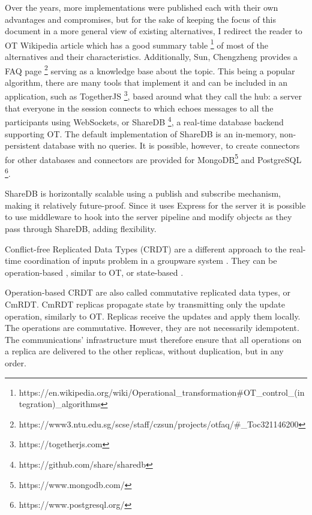 Over the years, more implementations were published each with their own advantages and compromises, but for the sake of keeping the focus of this document in a more general view of existing alternatives, I redirect the reader to OT Wikipedia article which has a good summary table \footnote{https://en.wikipedia.org/wiki/Operational\_transformation\#OT\_control\_(integration)\_algorithms} of most of the alternatives and their characteristics. Additionally, Sun, Chengzheng provides a FAQ page \footnote{https://www3.ntu.edu.sg/scse/staff/czsun/projects/otfaq/\#\_Toc321146200} serving as a knowledge base about the topic. This being a popular algorithm, there are many tools that implement it and can be included in an application, such as TogetherJS \footnote{https://togetherjs.com}, based around what they call the hub: a server that everyone in the session connects to which echoes messages to all the participants using WebSockets, or ShareDB \footnote{https://github.com/share/sharedb}, a real-time database backend supporting OT. The default implementation of ShareDB is an in-memory, non-persistent database with no queries. It is possible, however, to create connectors for other databases and connectors are provided for MongoDB\footnote{https://www.mongodb.com/} and PostgreSQL \footnote{https://www.postgresql.org/}.

ShareDB is horizontally scalable using a publish and subscribe mechanism, making it relatively future-proof. Since it uses Express for the server it is possible to use middleware to hook into the server pipeline and modify objects as they pass through ShareDB, adding flexibility.

Conflict-free Replicated Data Types (CRDT) are a different approach to the real-time coordination of inputs problem in a groupware system \cite{Shapiro2011}. They can be operation-based \cite{Letia2010} \cite{Baquero2014}, similar to OT, or state-based \cite{Baquero1999} \cite{Almeida2014}.

Operation-based CRDT are also called commutative replicated data types, or CmRDT. CmRDT replicas propagate state by transmitting only the update operation, similarly to OT. Replicas receive the updates and apply them locally. The operations are commutative. However, they are not necessarily idempotent. The communications' infrastructure must therefore ensure that all operations on a replica are delivered to the other replicas, without duplication, but in any order.

